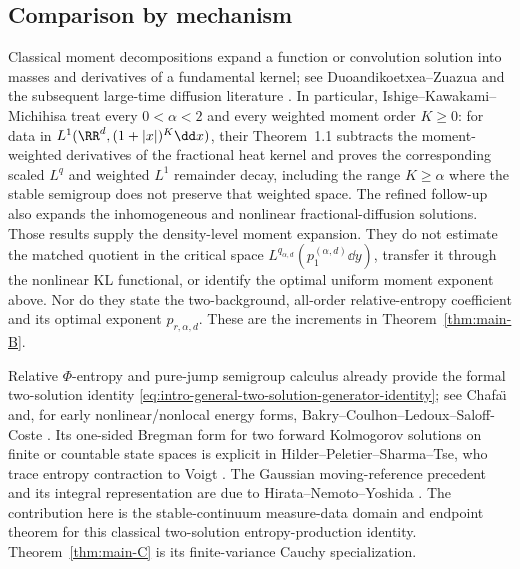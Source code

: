 \subsection*{Comparison by mechanism}
\label{subsec:intro-recent-jfa-comparison}

Classical moment decompositions expand a function or convolution solution
into masses and derivatives of a fundamental kernel; see
Duoandikoetxea--Zuazua \cite{DuoandikoetxeaZuazua1992} and the subsequent
large-time diffusion literature
\cite{EscobedoZuazua1991,IshigeKawakamiMichihisa2017,
IshigeKawakamiMichihisa2022RefinedFractional}.  In particular,
Ishige--Kawakami--Michihisa treat every \(0<\alpha<2\) and every weighted
moment order \(K\ge0\): for data in
\(L^1(\RR^d,(1+|x|)^K\dd x)\), their Theorem~1.1 subtracts the
moment-weighted derivatives of the fractional heat kernel and proves the
corresponding scaled \(L^q\) and weighted \(L^1\) remainder decay, including
the range \(K\ge\alpha\) where the stable semigroup does not preserve that
weighted space.  The refined follow-up also expands the inhomogeneous and
nonlinear fractional-diffusion solutions.  Those results supply the
density-level moment expansion.  They do not estimate the matched quotient
in the critical space \(L^{q_{\alpha,d}}(p_1^{(\alpha,d)}\dd y)\), transfer
it through the nonlinear KL functional, or identify the optimal uniform
moment exponent above.  Nor do they state the two-background, all-order
relative-entropy coefficient and its optimal exponent
\(p_{r,\alpha,d}\).  These are the increments in
Theorem~\ref{thm:main-B}.

Relative \(\Phi\)-entropy and pure-jump semigroup calculus already provide
the formal two-solution identity
\eqref{eq:intro-general-two-solution-generator-identity}; see Chafa{\"\i}
\cite{Chafai2004PhiEntropies} and, for early nonlinear/nonlocal energy forms,
Bakry--Coulhon--Ledoux--Saloff-Coste
\cite{BakryCoulhonLedouxSaloffCoste1995}.  Its one-sided Bregman form for two
forward Kolmogorov solutions on finite or countable state spaces is explicit
in Hilder--Peletier--Sharma--Tse, who trace entropy contraction to Voigt
\cite{HilderPeletierSharmaTse2020EntropyDistance,
Voigt1981StochasticOperators}.  The Gaussian moving-reference precedent and
its integral representation are due to Hirata--Nemoto--Yoshida
\cite{HirataNemotoYoshida2012IntegralRepresentation}.  The contribution here
is the stable-continuum measure-data domain and endpoint theorem for this
classical two-solution entropy-production identity.  Theorem~\ref{thm:main-C}
is its finite-variance Cauchy specialization.

